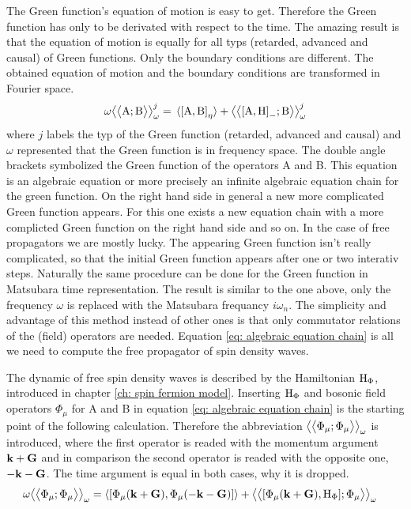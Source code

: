 The Green function's equation of motion is easy to get.
Therefore the Green function has only to be derivated with respect to the time.
The amazing result is that the equation of motion is equally for all typs (retarded, advanced and causal) of Green functions.
Only the boundary conditions are different.
The obtained equation of motion and the boundary conditions are transformed in Fourier space.
%
\begin{align}
	\omega \green{\mt{A}}{\mt{B}}_{\omega}^{j} = \expval*{\comm{\mt{A}}{\mt{B}}_{\eta}} + \green{\comm{\mt{A}}{\mt{H}}_{-}}{\mt{B}}_{\omega}^{j}
	\label{eq: algebraic equation chain}
\end{align}
%
where $j$ labels the typ of the Green function (retarded, advanced and causal) and $\omega$ represented that the Green function is in frequency space.
The double angle brackets symbolized the Green function of the operators A and B.
This equation is an algebraic equation or more precisely an infinite algebraic equation chain for the green function.
On the right hand side in general a new more complicated Green function appears.
For this one exists a new equation chain with a more complicted Green function on the right hand side and so on.
In the case of free propagators we are mostly lucky.
The appearing Green function isn't really complicated, so that the initial Green function appears after one or two interativ steps.
Naturally the same procedure can be done for the Green function in Matsubara time representation.
The result is similar to the one above, only the frequency $\omega$ is replaced with the Matsubara frequancy $i\omega_{n}$.
The simplicity and advantage of this method instead of other ones is that only commutator relations of the (field) operators are needed.
Equation \eqref{eq: algebraic equation chain} is all we need to compute the free propagator of spin density waves.

The dynamic of free spin density waves is described by the Hamiltonian $\mathrm{H}_{\Phi}$, introduced in chapter \ref{ch: spin fermion model}.
Inserting $\mathrm{H}_{\Phi}$ and bosonic field operators $\Phi_{\mu}$ for A and B in equation \eqref{eq: algebraic equation chain} is the starting point of the following calculation.
Therefore the abbreviation $\big\langle\big\langle{\Phi_{\mu}};{\Phi_{\mu}}\big\rangle\big\rangle_{\omega}$ is introduced, where the first operator is readed with the momentum argument $\vb{k}+\vb{G}$ and in comparison the second operator is readed with the opposite one, $-\vb{k}-\vb{G}$.
The time argument is equal in both cases, why it is dropped.
%
\begin{align}
	\omega \green{\Phi_{\mu}}{\Phi_{\mu}}_{\omega} &= 
		\expval{\comm{\Phi_{\mu}(\vb{k}+\vb{G})}{\Phi_{\mu}(-\vb{k}-\vb{G})}}
		+
		\green{\comm{\Phi_{\mu}(\vb{k}+\vb{G})}{\mt{H}_{\Phi}}}{\Phi_{\mu}}_{\omega}
		\label{eq: equation chain SDW}
\end{align}
%

